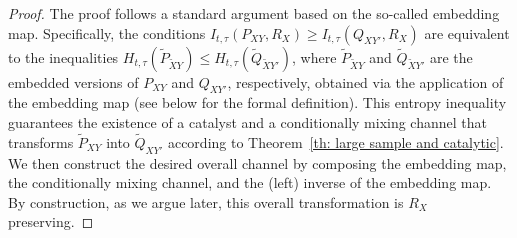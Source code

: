 \documentclass[aps,pra,11pt,onecolumn,nofootinbib,tightenlines]{revtex4-2}
\theoremstyle{definition}
\begin{document}
\begin{proof}
   The proof follows a standard argument based on the so-called embedding map. Specifically, the conditions $I_{t,\tau}(P_{XY},R_X) \geq I_{t,\tau}(Q_{XY'},R_X)$ are equivalent to the inequalities $H_{t,\tau}(\widetilde{P}_{\widetilde{X}Y}) \leq H_{t,\tau}(\widetilde{Q}_{\widetilde{X}Y'})$, where $\widetilde{P}_{\widetilde{X}Y}$ and $\widetilde{Q}_{\widetilde{X}Y'}$ are the embedded versions of $P_{XY}$ and $Q_{XY'}$, respectively, obtained via the application of the embedding map (see below for the formal definition).
   This entropy inequality guarantees the existence of a catalyst and a conditionally mixing channel
   that transforms $\widetilde{P}_{XY}$ into $\widetilde{Q}_{XY'}$ according to Theorem~\ref{th: large sample and catalytic}. We then construct the desired overall channel by composing the embedding map, the conditionally mixing channel, and the (left) inverse of the embedding map. By construction, as we argue later, this overall transformation is $R_X$ preserving.

\bigskip


\end{proof}
\end{document}
